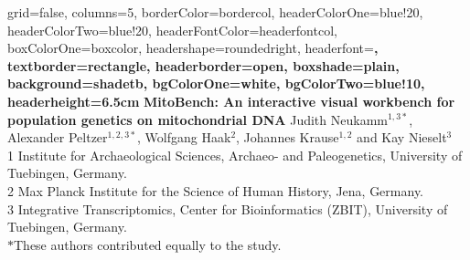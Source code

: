 \documentclass[a0paper,portrait, fontscale=0.285]{baposter}
\begin{document}


\begin{poster}{
	grid=false,
	columns=5,
	borderColor=bordercol,
	headerColorOne=blue!20,
	headerColorTwo=blue!20,
	headerFontColor=headerfontcol,
	boxColorOne=boxcolor,
	headershape=roundedright,
	headerfont=\large\sf\bf,
	textborder=rectangle,
	headerborder=open,
  	boxshade=plain,
	background=shadetb,
	bgColorOne=white,
	bgColorTwo=blue!10,
	headerheight=6.5cm
}
{
}
{\bf
	MitoBench: An interactive visual workbench for population genetics on mitochondrial DNA
}
{
	\vspace{1em} Judith Neukamm$^{1,3*}$, Alexander Peltzer$^{1,2,3*}$, Wolfgang Haak$^{2}$, Johannes Krause$^{1,2}$ and Kay Nieselt$^{3}$\\
	\vspace{1em}
	{\footnotesize 	1 Institute for Archaeological Sciences, Archaeo- and Paleogenetics, University of Tuebingen, Germany.\\
	2 Max Planck Institute for the Science of Human History, Jena, Germany.\\
	3 Integrative Transcriptomics, Center for Bioinformatics (ZBIT), University of Tuebingen, Germany.\\
	$*$These authors contributed equally to the study.
	}
}
{
}
\end{poster}
\end{document}
